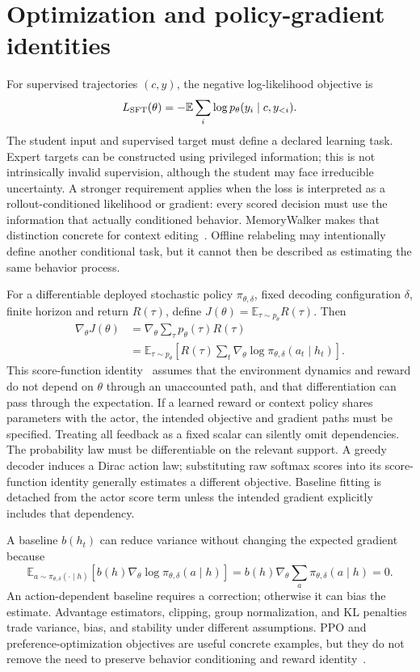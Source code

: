 \section{Optimization and policy-gradient identities}\label{sec:C02:04}
For supervised trajectories $(c,y)$, the negative log-likelihood objective is
\begin{equation}
 L_{\rm SFT}(\theta)=-\mathbb E\sum_i
 \log p_\theta(y_i\mid c,y_{<i}).
\end{equation}
The student input and supervised target must define a declared learning task. Expert targets can be constructed using privileged information; this is not intrinsically invalid supervision, although the student may face irreducible uncertainty. A stronger requirement applies when the loss is interpreted as a rollout-conditioned likelihood or gradient: every scored decision must use the information that actually conditioned behavior. MemoryWalker makes that distinction concrete for context editing~\cite{j2026memorywalker}. Offline relabeling may intentionally define another conditional task, but it cannot then be described as estimating the same behavior process.

For a differentiable deployed stochastic policy $\pi_{\theta,\delta}$, fixed decoding configuration $\delta$, finite horizon and return $R(\tau)$, define $J(\theta)=\mathbb E_{\tau\sim p_\theta}R(\tau)$. Then
\begin{align}
 \nabla_\theta J(\theta)
 &=\nabla_\theta\sum_\tau p_\theta(\tau)R(\tau)\\
 &=\mathbb E_{\tau\sim p_\theta}
 \left[R(\tau)\sum_t\nabla_\theta
 \log\pi_{\theta,\delta}(a_t\mid h_t)\right].
\end{align}
This score-function identity~\cite{ch02_policygradient1999} assumes that the environment dynamics and reward do not depend on $\theta$ through an unaccounted path, and that differentiation can pass through the expectation. If a learned reward or context policy shares parameters with the actor, the intended objective and gradient paths must be specified. Treating all feedback as a fixed scalar can silently omit dependencies. The probability law must be differentiable on the relevant support. A greedy decoder induces a Dirac action law; substituting raw softmax scores into its score-function identity generally estimates a different objective. Baseline fitting is detached from the actor score term unless the intended gradient explicitly includes that dependency.

A baseline $b(h_t)$ can reduce variance without changing the expected gradient because
\begin{equation}
 \mathbb E_{a\sim\pi_{\theta,\delta}(\cdot\mid h)}
 [b(h)\nabla_\theta\log\pi_{\theta,\delta}(a\mid h)]
 =b(h)\nabla_\theta\sum_a\pi_{\theta,\delta}(a\mid h)=0.
\end{equation}
An action-dependent baseline requires a correction; otherwise it can bias the estimate. Advantage estimators, clipping, group normalization, and KL penalties trade variance, bias, and stability under different assumptions. PPO and preference-optimization objectives are useful concrete examples, but they do not remove the need to preserve behavior conditioning and reward identity~\cite{schulman2017ppo,rafailov2023dpo}.

